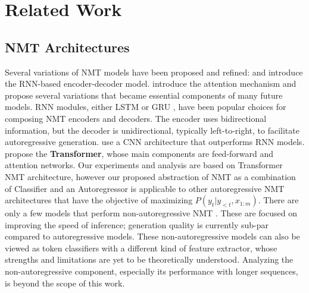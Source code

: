 
\section{Related Work}
\label{sec:related-work}


\subsection{NMT Architectures}
\label{sec:rel-nmt-arch}
Several variations of NMT models have been proposed and refined: \citet{sutskever2014seq2seq} and \citet{cho2014learning} introduce the RNN-based encoder-decoder model.
\citet{bahdanau2014nmtattn} introduce the attention mechanism and \citet{luong2015effectiveAttn} propose several variations that became essential components of many future models.
RNN modules, either LSTM \cite{hochreiter1997LSTM} or GRU \cite{cho-etal-2014-properties}, have been popular choices for composing NMT encoders and decoders.
The encoder uses bidirectional information, but the decoder is unidirectional, typically left-to-right, to facilitate autoregressive generation.
\citet{gehring2017CNNMT} use a CNN architecture that outperforms RNN models.
\citet{vaswani2017attention} propose the \textbf{Transformer}, whose main components are feed-forward and attention networks.
Our experiments and analysis are based on Transformer NMT architecture, however our proposed abstraction of NMT as a combination of Classifier and an Autoregressor is applicable to other autoregressive NMT architectures that have the objective of maximizing $P(y_t | y_{<t}, x_{1:m})$.
There are only a few models that perform non-autoregressive NMT \cite{libovicky-helcl-2018-end,Gu-etal-17-NonAR-NMT}.
These are focused on improving the speed of inference; generation quality is currently sub-par compared to autoregressive models.
These non-autoregressive models can also be viewed as token classifiers with a different kind of feature extractor, whose strengths and limitations are yet to be theoretically understood.
Analyzing the non-autoregressive component, especially its performance with longer sequences, is beyond the scope of this work.

